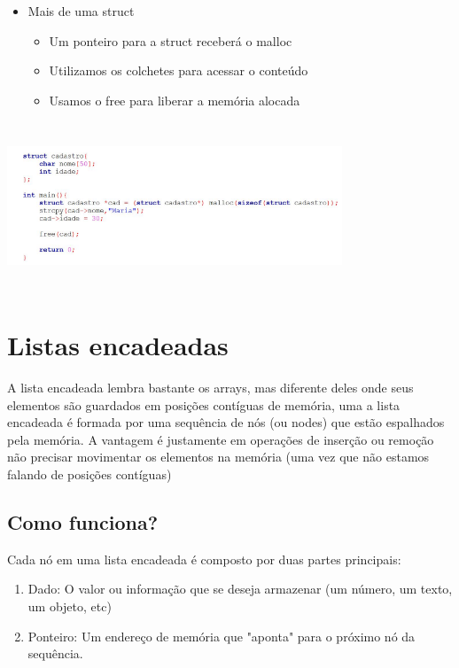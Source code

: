 \documentclass{report}
\begin{document}
	\begin{itemize}
		\item Mais de uma struct
		\begin{itemize}
			\item Um ponteiro para a struct receberá o malloc
			\item Utilizamos os colchetes para acessar o conteúdo
			\item Usamos o free para liberar a memória alocada	
		\end{itemize} 
	\end{itemize}
	
	\begin{center}
		
		\includegraphics[width=10cm,height=5cm,keepaspectratio=false]{imagens/alocstruct1.png}
		
	\end{center}
	
	\chapter{Listas encadeadas}
	
	A lista encadeada lembra bastante os arrays, mas diferente deles onde seus elementos são guardados em posições contíguas de memória, uma a lista encadeada é formada por uma sequência de nós (ou nodes) que estão espalhados pela memória. A vantagem é justamente em operações de inserção ou remoção não precisar movimentar os elementos na memória (uma vez que não estamos falando de posições contíguas)
	
	\section{Como funciona?}
	
	Cada nó em uma lista encadeada é composto por duas partes principais:
	
	\begin{enumerate}
		\item Dado: O valor ou informação que se deseja armazenar (um número, um texto, um objeto, etc)
		\item Ponteiro: Um endereço de memória que "aponta" para o próximo nó da sequência.
	\end{enumerate}
	
\end{document}
